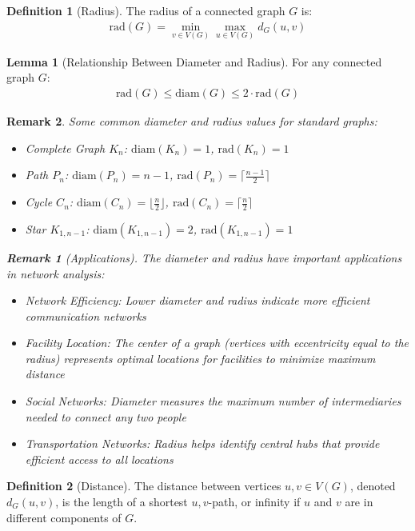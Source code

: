 \documentclass{article}
\newtheorem{remark}{Remark}
\theoremstyle{definition}
\newtheorem{lemma}{Lemma}
\newtheorem{definition}{Definition}
\begin{document}
\begin{definition}[Radius]
The radius of a connected graph $G$ is:
\begin{align*}
\text{rad}(G) = \min_{v \in V(G)} \max_{u \in V(G)} d_G(u,v)
\end{align*}
\end{definition}


\begin{lemma}[Relationship Between Diameter and Radius]
For any connected graph $G$:
\begin{align*}
\text{rad}(G) \leq \text{diam}(G) \leq 2 \cdot \text{rad}(G)
\end{align*}
\end{lemma}

\begin{remark}
Some common diameter and radius values for standard graphs:
\begin{itemize}
    \item Complete Graph $K_n$: $\text{diam}(K_n) = 1$, $\text{rad}(K_n) = 1$
    \item Path $P_n$: $\text{diam}(P_n) = n-1$, $\text{rad}(P_n) = \lceil\frac{n-1}{2}\rceil$
    \item Cycle $C_n$: $\text{diam}(C_n) = \lfloor\frac{n}{2}\rfloor$, $\text{rad}(C_n) = \lceil\frac{n}{2}\rceil$
    \item Star $K_{1,n-1}$: $\text{diam}(K_{1,n-1}) = 2$, $\text{rad}(K_{1,n-1}) = 1$
\end{itemize}
\begin{remark}[Applications]
The diameter and radius have important applications in network analysis:
\begin{itemize}
    \item Network Efficiency: Lower diameter and radius indicate more efficient communication networks
    \item Facility Location: The center of a graph (vertices with eccentricity equal to the radius) represents optimal locations for facilities to minimize maximum distance
    \item Social Networks: Diameter measures the maximum number of intermediaries needed to connect any two people
    \item Transportation Networks: Radius helps identify central hubs that provide efficient access to all locations
\end{itemize}
\end{remark}
\end{remark}

\begin{definition}[Distance]
The distance between vertices $u, v \in V(G)$, denoted $d_G(u,v)$, is the length of a shortest $u,v$-path, or infinity if $u$ and $v$ are in different components of $G$.
\end{definition}
\end{document}
